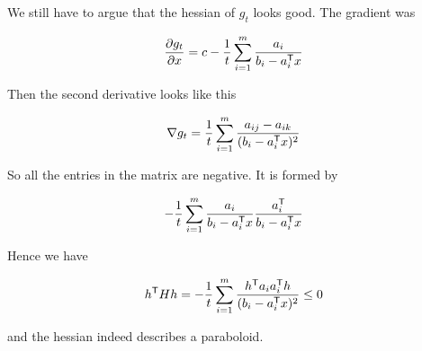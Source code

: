 We still have to argue that the hessian of $g_t$ looks good. The gradient was

\[\frac{\partial g_t}{\partial x} = c-\frac{1}{t} \sum_{i=1}^m \frac{a_i}{b_i-{a}^\text{\upshape \sffamily T}_i x}\]

Then the second derivative looks like this

\[\nabla g_t = \frac 1t  \sum_{i=1}^m \frac{a_{ij} - a_{ik} }{(b_i - {a}^\text{\upshape \sffamily T}_i x)^2}\]

So all the entries in the matrix are negative. It is formed by

\[-\frac{1}{t} \sum_{i=1}^m \frac{a_i}{b_i-{a}^\text{\upshape \sffamily T}_i x} \frac{{a}^\text{\upshape \sffamily T}_i}{b_i-{a}^\text{\upshape \sffamily T}_i x}\]

Hence we have 

\[{h}^\text{\upshape \sffamily T} H h = -\frac{1}{t} \sum_{i=1}^m\frac{{h}^\text{\upshape \sffamily T} a_i {a}^\text{\upshape \sffamily T}_i h}{(b_i - {a}^\text{\upshape \sffamily T}_i x)^2} \leq 0\]

and the hessian indeed describes a paraboloid.